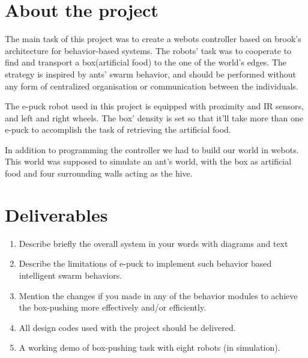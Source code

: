 \section{About the project}

The main task of this project was to create a webots controller based on brook’s architecture for behavior-based systems. The robots’ task was to cooperate to find and transport a box(artificial food) to the one of the world’s edges. The strategy is inspired by ants’ swarm behavior, and should be performed without any form of centralized organisation or communication between the individuals.

The e-puck robot used in this project is equipped with proximity and IR sensors, and left and right wheels. The box’ density is set so that it’ll take more than one e-puck to accomplish the task of retrieving the artificial food.

In addition to programming the controller we had to build our world in webots. This world was supposed to simulate an ant’s world, with the box as artificial food and four surrounding walls acting as the hive.

\section{Deliverables}


\begin{enumerate}
	\item Describe briefly the overall system in your words with diagrams and text
	\item Describe the limitations of e-puck to implement such behavior based intelligent swarm behaviors.
	\item Mention the changes if you made in any of the behavior modules to achieve the box-pushing more effectively and/or efficiently.
	\item All design codes used with the project should be delivered.
	\item A working demo of box-pushing task with eight robots (in simulation).
\end{enumerate}
